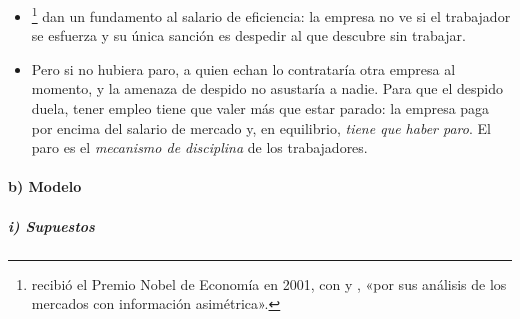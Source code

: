 \documentclass[11pt]{article}
\begin{document}
\begin{itemize}
\item \textcite{ShapiroStiglitz1984Equilibrium}\footnote{ recibió el Premio Nobel de Economía en 2001, con  y , «por sus análisis de los mercados con información asimétrica»\nocite{Nobel2001AkerlofSpenceStiglitz}.} dan un fundamento al salario de eficiencia: la empresa no ve si el trabajador se esfuerza y su única sanción es despedir al que descubre sin trabajar.
\item Pero si no hubiera paro, a quien echan lo contrataría otra empresa al momento, y la amenaza de despido no asustaría a nadie. Para que el despido duela, tener empleo tiene que valer más que estar parado: la empresa paga por encima del salario de mercado y, en equilibrio, \emph{tiene que haber paro}. El paro es el \emph{mecanismo de disciplina} de los trabajadores.
\end{itemize}

\paragraph{b) Modelo}

\subparagraph{i) Supuestos}
\end{document}
